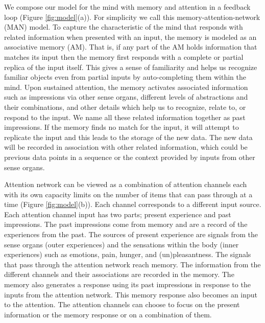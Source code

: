 \documentclass[reprint,amsmath,amssymb,apr,aip,onecolumn, 11pt]{revtex4-1}
\begin{document}
	
		We compose our model for the mind with memory and attention in a feedback loop (Figure \ref{fig:model}(a)). For simplicity we call this memory-attention-network (MAN) model. To capture the characteristic of the mind that responds with related information when presented with an input, the memory is modeled as an associative memory (AM). That is, if any part of the AM holds information that matches its input then the memory first responds with a complete or partial replica of the input itself. This gives a sense of familiarity and helps us recognize familiar objects even from partial inputs by auto-completing them within the mind. Upon sustained attention, the memory activates associated information such as impressions via other sense organs, different levels of abstractions and their combinations, and other details which help us to recognize, relate to, or respond to the input. We name all these related information together as past impressions. If the memory finds no match for the input, it will attempt to replicate the input and this leads to the storage of the new data. The new data will be recorded in association with other related information, which could be previous data points in a sequence or the context provided by inputs from other sense organs. 
%		
		
		 Attention network can be viewed as a combination of attention channels each with its own capacity limits on the number of items that can pass through at a time (Figure \ref{fig:model}(b)). Each channel corresponds to a different input source. Each attention channel input has two parts; present experience and past impressions. The past impressions come from memory and are a record of the experiences from the past. The sources of present experience are signals from the sense organs (outer experiences) and the sensations within the body (inner experiences) such as emotions,  pain, hunger, and (un)pleasantness. The signals that pass through the attention network reach memory. The information from the different channels and their associations are recorded in the memory. The memory also generates a response using its past impressions in response to the inputs from the attention network. This memory response also becomes an input to the attention. The attention channels can choose to focus on the present information or the memory response or on a combination of them. 
		 
\end{document}
